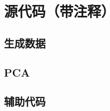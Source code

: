 \documentclass[lang=cn,11pt,a4paper,cite=authoryear]{elegantpaper}
\begin{document}
\nocite{*}

\appendix
\addappheadtotoc
\section{源代码（带注释）}
\subsection{生成数据}




\subsection{PCA}




\subsection{辅助代码}


\end{document}
